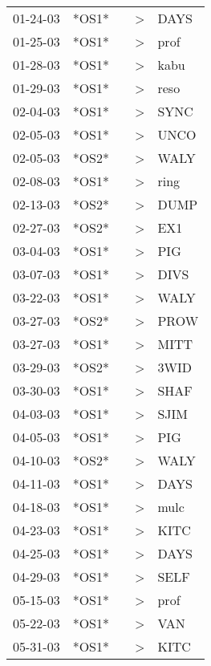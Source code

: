 \begin{supertabular}{lllll}
 01-24-03 &  *OS1* &   &     \textgreater &  DAYS \\
 01-25-03 &  *OS1* &   &     \textgreater &  prof \\
 01-28-03 &  *OS1* &   &     \textgreater &  kabu \\
 01-29-03 &  *OS1* &   &     \textgreater &  reso \\
 02-04-03 &  *OS1* &   &     \textgreater &  SYNC \\
 02-05-03 &  *OS1* &   &     \textgreater &  UNCO \\
 02-05-03 &  *OS2* &   &     \textgreater &  WALY \\
 02-08-03 &  *OS1* &   &     \textgreater &  ring \\
 02-13-03 &  *OS2* &   &     \textgreater &  DUMP \\
 02-27-03 &  *OS2* &   &     \textgreater &   EX1 \\
 03-04-03 &  *OS1* &   &     \textgreater &   PIG \\
 03-07-03 &  *OS1* &   &     \textgreater &  DIVS \\
 03-22-03 &  *OS1* &   &     \textgreater &  WALY \\
 03-27-03 &  *OS2* &   &     \textgreater &  PROW \\
 03-27-03 &  *OS1* &   &     \textgreater &  MITT \\
 03-29-03 &  *OS2* &   &     \textgreater &  3WID \\
 03-30-03 &  *OS1* &   &     \textgreater &  SHAF \\
 04-03-03 &  *OS1* &   &     \textgreater &  SJIM \\
 04-05-03 &  *OS1* &   &     \textgreater &   PIG \\
 04-10-03 &  *OS2* &   &     \textgreater &  WALY \\
 04-11-03 &  *OS1* &   &     \textgreater &  DAYS \\
 04-18-03 &  *OS1* &   &     \textgreater &  mulc \\
 04-23-03 &  *OS1* &   &     \textgreater &  KITC \\
 04-25-03 &  *OS1* &   &     \textgreater &  DAYS \\
 04-29-03 &  *OS1* &   &     \textgreater &  SELF \\
 05-15-03 &  *OS1* &   &     \textgreater &  prof \\
 05-22-03 &  *OS1* &   &     \textgreater &   VAN \\
 05-31-03 &  *OS1* &   &     \textgreater &  KITC \\

\end{supertabular}
